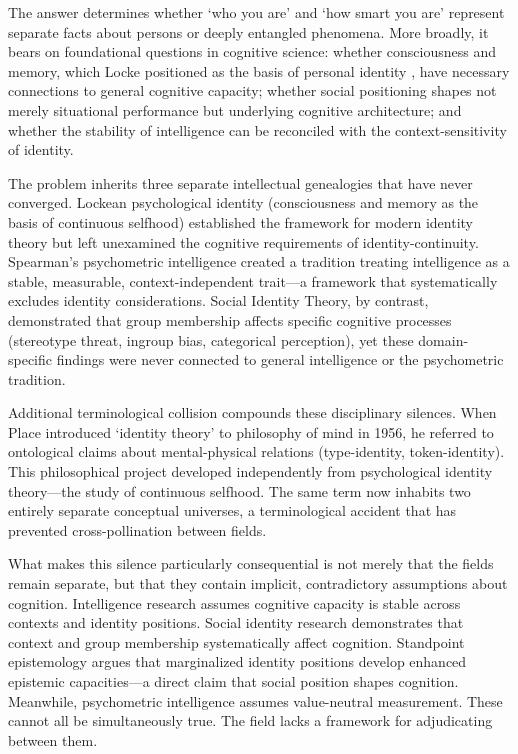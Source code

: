 \documentclass[12pt, a4paper]{article}
\begin{document}
The answer determines whether `who you are' and `how smart you are' represent separate facts about persons or deeply entangled phenomena. More broadly, it bears on foundational questions in cognitive science: whether consciousness and memory, which Locke positioned as the basis of personal identity \cite{Locke1690}, have necessary connections to general cognitive capacity; whether social positioning shapes not merely situational performance but underlying cognitive architecture; and whether the stability of intelligence can be reconciled with the context-sensitivity of identity.

The problem inherits three separate intellectual genealogies that have never converged. Lockean psychological identity (consciousness and memory as the basis of continuous selfhood) established the framework for modern identity theory but left unexamined the cognitive requirements of identity-continuity. Spearman's psychometric intelligence created a tradition treating intelligence as a stable, measurable, context-independent trait—a framework that systematically excludes identity considerations. Social Identity Theory, by contrast, demonstrated that group membership affects specific cognitive processes (stereotype threat, ingroup bias, categorical perception), yet these domain-specific findings were never connected to general intelligence or the psychometric tradition.

Additional terminological collision compounds these disciplinary silences. When Place introduced `identity theory' to philosophy of mind in 1956, he referred to ontological claims about mental-physical relations (type-identity, token-identity). This philosophical project developed independently from psychological identity theory—the study of continuous selfhood. The same term now inhabits two entirely separate conceptual universes, a terminological accident that has prevented cross-pollination between fields.

What makes this silence particularly consequential is not merely that the fields remain separate, but that they contain implicit, contradictory assumptions about cognition. Intelligence research assumes cognitive capacity is stable across contexts and identity positions. Social identity research demonstrates that context and group membership systematically affect cognition. Standpoint epistemology argues that marginalized identity positions develop enhanced epistemic capacities—a direct claim that social position shapes cognition. Meanwhile, psychometric intelligence assumes value-neutral measurement. These cannot all be simultaneously true. The field lacks a framework for adjudicating between them.
\end{document}
